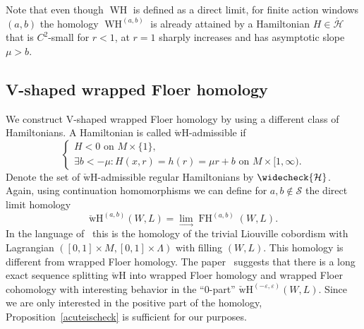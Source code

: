 \documentclass{amsart}
\newcommand{\Hcal}{{\mathcal{H}}}
\newcommand{\Scal}{{\mathcal{S}}}
\newcommand{\FH}{\operatorname{FH}}
\newcommand{\WslantH}{\operatorname{WH}}
\newcommand{\WcheckH}{\operatorname{\check wH}}
\newtheorem{theorem}{Theorem}
\theoremstyle{definition}
\theoremstyle{remark}
\numberwithin{equation}{section}
\begin{document}
Note that even though $\WslantH$ is defined as a direct limit, for finite action windows $(a,b)$ the homology $\WslantH^{(a,b)}$ is already attained by a Hamiltonian $H\in\acute \Hcal$ that is $C^2$-small for $r<1$, at $r=1$ sharply increases and has asymptotic slope $\mu>b$.

\subsection{V-shaped wrapped Floer homology}\label{sec:vwh}

We construct V-shaped wrapped Floer homology by using a different class of Hamiltonians. A Hamiltonian is called $\WcheckH$-admissible if
\begin{equation*}
	\begin{cases}
		H<0 \mbox{ on $M\times\{1\}$,}	\\
		\exists b<-\mu\colon H(x,r)=h(r)=\mu r+b\mbox{ on $M\times[1,\infty)$.}
	\end{cases}
\label{vadmissible}
\end{equation*}
Denote the set of $\WcheckH$-admissible regular Hamiltonians by $\widecheck \Hcal$. Again, using continuation homomorphisms we can define for $a,b\notin\Scal$ the direct limit homology 
\begin{equation*}
	\WcheckH^{(a,b)}(W,L)=\lim_{\longrightarrow} \FH^{(a,b)}(W,L).
\end{equation*}
In the language of~\cite{CO17} this is the homology of the trivial Liouville cobordism with Lagrangian $([0,1]\times M, [0,1]\times \Lambda)$ with filling $(W,L)$. This homology is different from wrapped Floer homology. The paper~\cite{CFO10} suggests that there is a long exact sequence splitting $\WcheckH$ into wrapped Floer homology and wrapped Floer cohomology with interesting behavior in the ``$0$-part'' $\WcheckH^{(-\varepsilon,\varepsilon)}(W,L)$. Since we are only interested in the positive part of the homology, Proposition~\ref{acuteischeck} is sufficient for our purposes.
\end{document}
